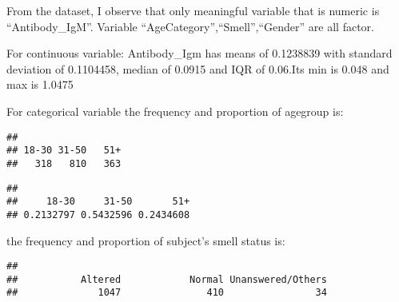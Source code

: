 \documentclass[]{article}
\newenvironment{Shaded}{\begin{snugshade}}{\end{snugshade}}
\newcommand{\CommentTok}[1]{\textcolor[rgb]{0.56,0.35,0.01}{\textit{#1}}}
\newcommand{\KeywordTok}[1]{\textcolor[rgb]{0.13,0.29,0.53}{\textbf{#1}}}
\newcommand{\NormalTok}[1]{#1}
\newcommand{\OperatorTok}[1]{\textcolor[rgb]{0.81,0.36,0.00}{\textbf{#1}}}
\begin{document}
From the dataset, I observe that only meaningful variable that is
numeric is ``Antibody\_IgM''. Variable
``AgeCategory'',``Smell'',``Gender'' are all factor.

For continuous variable: Antibody\_Igm has means of 0.1238839 with
standard deviation of 0.1104458, median of 0.0915 and IQR of 0.06.Its
min is 0.048 and max is 1.0475

For categorical variable the frequency and proportion of agegroup is:

\begin{Shaded}
\end{Shaded}

\begin{verbatim}
## 
## 18-30 31-50   51+ 
##   318   810   363
\end{verbatim}

\begin{Shaded}
\end{Shaded}

\begin{verbatim}
## 
##     18-30     31-50       51+ 
## 0.2132797 0.5432596 0.2434608
\end{verbatim}

the frequency and proportion of subject's smell status is:

\begin{Shaded}
\end{Shaded}

\begin{verbatim}
## 
##           Altered            Normal Unanswered/Others 
##              1047               410                34
\end{verbatim}

\begin{Shaded}
\end{Shaded}
\end{document}
